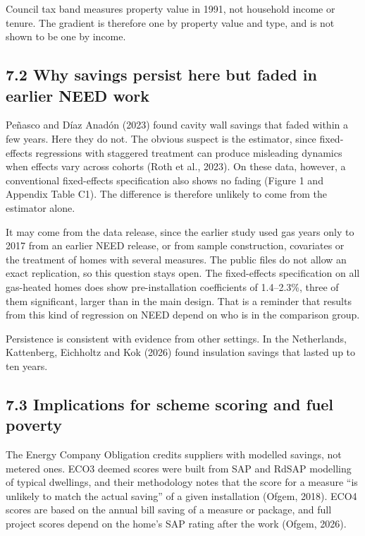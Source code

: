\documentclass[11pt,a4paper]{article}
\begin{document}
Council tax band measures property value in 1991, not household income or tenure. The gradient is therefore one by property value and type, and is not shown to be one by income.

\subsection*{7.2 Why savings persist here but faded in earlier NEED work}

Peñasco and Díaz Anadón (2023) found cavity wall savings that faded within a few years. Here they do not. The obvious suspect is the estimator, since fixed-effects regressions with staggered treatment can produce misleading dynamics when effects vary across cohorts (Roth et al., 2023). On these data, however, a conventional fixed-effects specification also shows no fading (Figure 1 and Appendix Table C1). The difference is therefore unlikely to come from the estimator alone.

It may come from the data release, since the earlier study used gas years only to 2017 from an earlier NEED release, or from sample construction, covariates or the treatment of homes with several measures. The public files do not allow an exact replication, so this question stays open. The fixed-effects specification on all gas-heated homes does show pre-installation coefficients of 1.4--2.3\%, three of them significant, larger than in the main design. That is a reminder that results from this kind of regression on NEED depend on who is in the comparison group.

Persistence is consistent with evidence from other settings. In the Netherlands, Kattenberg, Eichholtz and Kok (2026) found insulation savings that lasted up to ten years.

\subsection*{7.3 Implications for scheme scoring and fuel poverty}

The Energy Company Obligation credits suppliers with modelled savings, not metered ones. ECO3 deemed scores were built from SAP and RdSAP modelling of typical dwellings, and their methodology notes that the score for a measure ``is unlikely to match the actual saving'' of a given installation (Ofgem, 2018). ECO4 scores are based on the annual bill saving of a measure or package, and full project scores depend on the home's SAP rating after the work (Ofgem, 2026).
\end{document}
